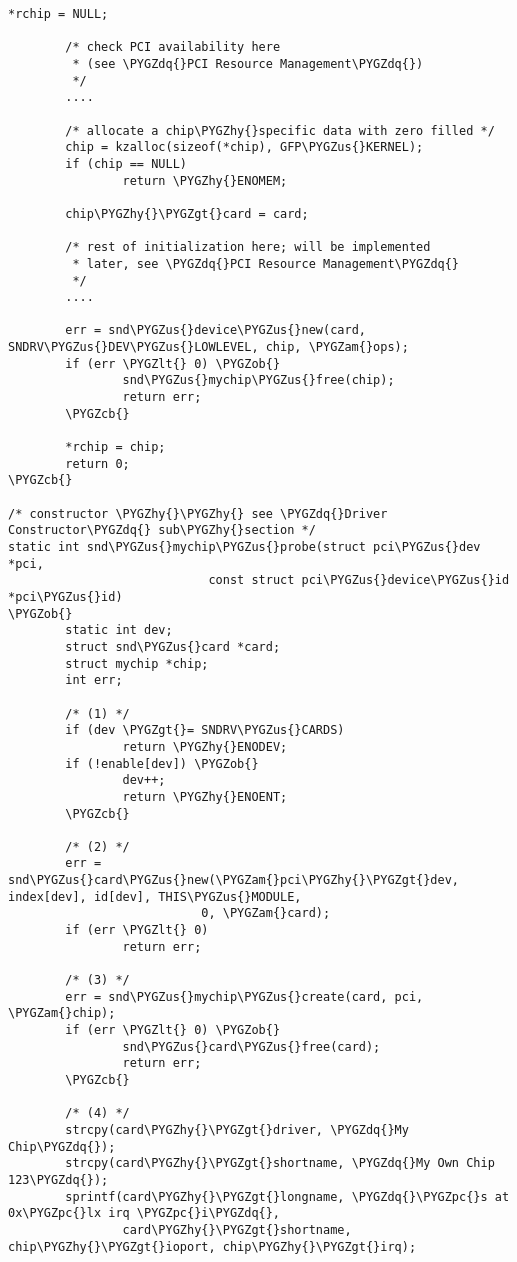 \documentclass[a4paper,8pt,english]{sphinxmanual}
\def\PYGZus{\char`\_}
\def\PYGZob{\char`\{}
\def\PYGZcb{\char`\}}
\def\PYGZam{\char`\&}
\def\PYGZlt{\char`\<}
\def\PYGZgt{\char`\>}
\def\PYGZpc{\char`\%}
\def\PYGZhy{\char`\-}
\def\PYGZdq{\char`\"}
\begin{document}
\begin{Verbatim}[commandchars=\\\{\}]
        *rchip = NULL;

        /* check PCI availability here
         * (see \PYGZdq{}PCI Resource Management\PYGZdq{})
         */
        ....

        /* allocate a chip\PYGZhy{}specific data with zero filled */
        chip = kzalloc(sizeof(*chip), GFP\PYGZus{}KERNEL);
        if (chip == NULL)
                return \PYGZhy{}ENOMEM;

        chip\PYGZhy{}\PYGZgt{}card = card;

        /* rest of initialization here; will be implemented
         * later, see \PYGZdq{}PCI Resource Management\PYGZdq{}
         */
        ....

        err = snd\PYGZus{}device\PYGZus{}new(card, SNDRV\PYGZus{}DEV\PYGZus{}LOWLEVEL, chip, \PYGZam{}ops);
        if (err \PYGZlt{} 0) \PYGZob{}
                snd\PYGZus{}mychip\PYGZus{}free(chip);
                return err;
        \PYGZcb{}

        *rchip = chip;
        return 0;
\PYGZcb{}

/* constructor \PYGZhy{}\PYGZhy{} see \PYGZdq{}Driver Constructor\PYGZdq{} sub\PYGZhy{}section */
static int snd\PYGZus{}mychip\PYGZus{}probe(struct pci\PYGZus{}dev *pci,
                            const struct pci\PYGZus{}device\PYGZus{}id *pci\PYGZus{}id)
\PYGZob{}
        static int dev;
        struct snd\PYGZus{}card *card;
        struct mychip *chip;
        int err;

        /* (1) */
        if (dev \PYGZgt{}= SNDRV\PYGZus{}CARDS)
                return \PYGZhy{}ENODEV;
        if (!enable[dev]) \PYGZob{}
                dev++;
                return \PYGZhy{}ENOENT;
        \PYGZcb{}

        /* (2) */
        err = snd\PYGZus{}card\PYGZus{}new(\PYGZam{}pci\PYGZhy{}\PYGZgt{}dev, index[dev], id[dev], THIS\PYGZus{}MODULE,
                           0, \PYGZam{}card);
        if (err \PYGZlt{} 0)
                return err;

        /* (3) */
        err = snd\PYGZus{}mychip\PYGZus{}create(card, pci, \PYGZam{}chip);
        if (err \PYGZlt{} 0) \PYGZob{}
                snd\PYGZus{}card\PYGZus{}free(card);
                return err;
        \PYGZcb{}

        /* (4) */
        strcpy(card\PYGZhy{}\PYGZgt{}driver, \PYGZdq{}My Chip\PYGZdq{});
        strcpy(card\PYGZhy{}\PYGZgt{}shortname, \PYGZdq{}My Own Chip 123\PYGZdq{});
        sprintf(card\PYGZhy{}\PYGZgt{}longname, \PYGZdq{}\PYGZpc{}s at 0x\PYGZpc{}lx irq \PYGZpc{}i\PYGZdq{},
                card\PYGZhy{}\PYGZgt{}shortname, chip\PYGZhy{}\PYGZgt{}ioport, chip\PYGZhy{}\PYGZgt{}irq);


\end{Verbatim}
\end{document}
